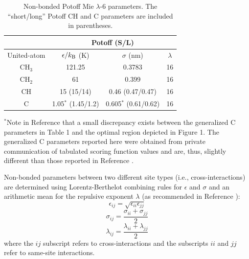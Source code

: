 \documentclass[preprint,review,12pt]{elsarticle}
\begin{document}
	\begin{table}[h!]
		\caption{Non-bonded Potoff Mie $\lambda$-6 parameters. The ``short/long'' Potoff CH and C parameters are included in parentheses.} \label{tab:nonbonded params}
		\begin{center}
			\begin{tabular}{|c|c|c|c|}
				\hline
				\multicolumn{1}{|c}{} & \multicolumn{3}{|c|}{Potoff (S/L)}  \\ \hline
				United-atom & $\epsilon/k_{\rm B}$ (K) & $\sigma$ (nm) & $\lambda$ \\ \hline
				CH$_3$ & 121.25 & 0.3783 & 16  \\ 
				CH$_2$ & 61 & 0.399 & 16 \\ 
				CH & 15 (15/14) & 0.46 (0.47/0.47) & 16\\
				C & 1.05$^*$ (1.45/1.2) & 0.605$^*$ (0.61/0.62) & 16\\
				\hline
			\end{tabular}
		\end{center} 
	\footnotesize
	    $^*$Note in Reference  that a small discrepancy exists between the generalized C parameters in Table 1 and the optimal region depicted in Figure 1. The generalized C parameters reported here were obtained from private communication of tabulated scoring function values and are, thus, slightly different than those reported in Reference .
	\end{table}

\normalsize
	
	Non-bonded parameters between two different site types (i.e., cross-interactions) are determined using Lorentz-Berthelot combining rules \cite{Allen2017} for $\epsilon$ and $\sigma$ and an arithmetic mean for the repulsive exponent $\lambda$ (as recommended in Reference ):
	\begin{equation} \label{eq:Lorentz-Berthelot_eps}
	\epsilon_{ij} = \sqrt{\epsilon_{ii} \epsilon_{jj}}
	\end{equation}
	\begin{equation} \label{eq:Lorentz-Berthelot_sig}
	\sigma_{ij} = \frac{\sigma_{ii} + \sigma_{jj}}{2}
	\end{equation}
	\begin{equation} \label{eq:Lorentz-Berthelot_lam}
	\lambda_{ij} = \frac{\lambda_{ii} + \lambda_{jj}}{2}
	\end{equation}
	where the $ij$ subscript refers to cross-interactions and the subscripts $ii$ and $jj$ refer to same-site interactions. 
	
\end{document}
